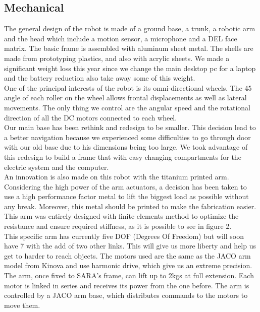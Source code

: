\documentclass[runningheads,a4paper]{llncs}
\begin{document}
\subsection{Mechanical}
\tab The general design of the robot is made of a ground base, a trunk, a robotic arm and the head which include a motion sensor, a microphone and a DEL face matrix. The basic frame is assembled with aluminum sheet metal. The shells are made from prototyping plastics, and also with acrylic sheets. We made a significant weight loss this year since we change the main desktop pc for a laptop and the battery reduction also take away some of this weight.  \\

One of the principal interests of the robot is its omni-directional wheels. The 45 angle of each roller on the wheel allows frontal displacements as well as lateral movements. The only thing we control are the angular speed and the rotational direction of all the DC motors connected to each wheel. \\

Our main base has been rethink and redesign to be smaller. This decision lead to a better navigation because we experienced some difficulties to go through door with our old base due to his dimensions being too large. We took advantage of this redesign to build a frame that with easy changing compartments for the electric system and the computer. \\

An innovation is also made on this robot with the titanium printed arm. Considering the high power of the arm actuators, a decision has been taken to use a high performance factor metal to lift the biggest load as possible without any break. Moreover, this metal should be printed to make the fabrication easier. This arm was entirely designed with finite elements method to optimize the resistance and ensure required stiffness, as it is possible to see in figure 2. \\

This specific arm has currently five DOF (Degrees Of Freedom) but will soon have 7 with the add of two other links. This will give us more liberty and help us get to harder to reach objects. The motors used are the same as the JACO arm model from Kinova and use harmonic drive, which give us an extreme precision. The arm, once fixed to SARA’s frame, can lift up to 2kgs at full extension. Each motor is linked in series and receives its power from the one before. The arm is controlled by a JACO arm base, which distributes commands to the motors to move them. \\
\end{document}
